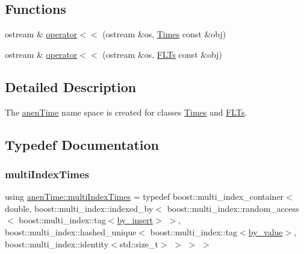 \subsection*{Functions}
\begin{DoxyCompactItemize}
\item 
ostream \& \mbox{\hyperlink{namespaceanen_time_ab90a5dd8a6a0a1bd15220276fe8043b7}{operator$<$$<$}} (ostream \&os, \mbox{\hyperlink{classanen_time_1_1_times}{Times}} const \&obj)
\item 
ostream \& \mbox{\hyperlink{namespaceanen_time_a51b4045300f072275ce700d5b3362ca6}{operator$<$$<$}} (ostream \&os, \mbox{\hyperlink{classanen_time_1_1_f_l_ts}{F\+L\+Ts}} const \&obj)
\end{DoxyCompactItemize}


\subsection{Detailed Description}
The \mbox{\hyperlink{namespaceanen_time}{anen\+Time}} name space is created for classes \mbox{\hyperlink{classanen_time_1_1_times}{Times}} and \mbox{\hyperlink{classanen_time_1_1_f_l_ts}{F\+L\+Ts}}. 

\subsection{Typedef Documentation}
\mbox{\label{namespaceanen_time_af2da8a18b50eb82edcc7b36e2a6b6441}} 
\subsubsection{\texorpdfstring{multi\+Index\+Times}{multiIndexTimes}}
{\footnotesize\ttfamily using \mbox{\hyperlink{namespaceanen_time_af2da8a18b50eb82edcc7b36e2a6b6441}{anen\+Time\+::multi\+Index\+Times}} = typedef boost\+::multi\+\_\+index\+\_\+container$<$ double, boost\+::multi\+\_\+index\+::indexed\+\_\+by$<$ boost\+::multi\+\_\+index\+::random\+\_\+access$<$ boost\+::multi\+\_\+index\+::tag$<$\mbox{\hyperlink{structanen_time_1_1by__insert}{by\+\_\+insert}}$>$ $>$, boost\+::multi\+\_\+index\+::hashed\+\_\+unique$<$ boost\+::multi\+\_\+index\+::tag$<$\mbox{\hyperlink{structanen_time_1_1by__value}{by\+\_\+value}}$>$, boost\+::multi\+\_\+index\+::identity$<$std\+::size\+\_\+t$>$ $>$ $>$ $>$}

